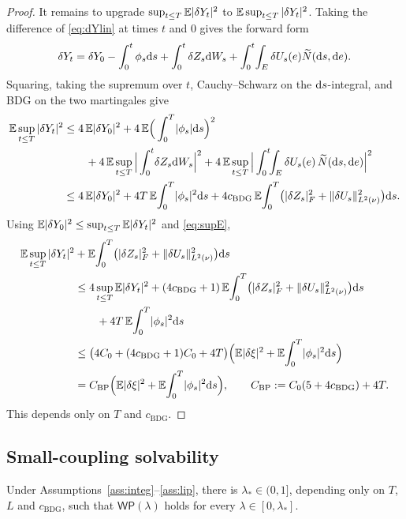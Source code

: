 \begin{proof}
It remains to upgrade $\sup_{t\le T}\mathbb{E}|\delta Y_t|^2$ to $\mathbb{E}\sup_{t\le T}|\delta Y_t|^2$. Taking the difference of
\eqref{eq:dYlin} at times $t$ and $0$ gives the forward form
\[
\delta Y_t=\delta Y_0-\int_0^t\phi_s\mathrm{d} s+\int_0^t\delta Z_s\mathrm{d} W_s+\int_0^t\!\int_E\delta U_s(e)\widetilde{N}(\mathrm{d} s,\mathrm{d} e) .
\]
Squaring, taking the supremum over $t$, Cauchy--Schwarz on the $\mathrm{d} s$-integral, and BDG on
the two martingales give
\begin{align*}
\E\sup_{t\le T}|\delta Y_t|^2
&\le 4\,\E|\delta Y_0|^2+4\,\E\Big(\int_0^T\!|\phi_s|\diff s\Big)^{2}\\
&\qquad+4\,\E\sup_{t\le T}\Big|\int_0^t\!\delta Z_s\diff W_s\Big|^{2}
+4\,\E\sup_{t\le T}\Big|\int_0^t\!\!\int_E\delta U_s(e)\,\Nt(\diff s,\diff e)\Big|^{2}\\
&\le 4\,\E|\delta Y_0|^2+4T\,\E\!\int_0^T\!|\phi_s|^2\diff s
+4c_{\mathrm{BDG}}\,\E\!\int_0^T\!\big(|\delta Z_s|_F^2+\Lnorm{\delta U_s}^2\big)\diff s .
\end{align*}
Using $\mathbb{E}|\delta Y_0|^2\le\sup_{t\le T}\mathbb{E}|\delta Y_t|^2$ and \eqref{eq:supE},
\begin{align*}
\E\sup_{t\le T}|\delta Y_t|^2
&+\E\!\int_0^T\!\big(|\delta Z_s|_F^2+\Lnorm{\delta U_s}^2\big)\diff s\\
&\le 4\sup_{t\le T}\E|\delta Y_t|^2
+(4c_{\mathrm{BDG}}+1)\,\E\!\int_0^T\!\big(|\delta Z_s|_F^2+\Lnorm{\delta U_s}^2\big)\diff s\\
&\qquad+4T\,\E\!\int_0^T\!|\phi_s|^2\diff s\\
&\le\big(4C_0+(4c_{\mathrm{BDG}}+1)C_0+4T\big)
\Big(\E|\delta\xi|^2+\E\!\int_0^T\!|\phi_s|^2\diff s\Big)\\
&=C_{\mathrm{BP}}\Big(\E|\delta\xi|^2+\E\!\int_0^T\!|\phi_s|^2\diff s\Big),
\qquad C_{\mathrm{BP}}:=C_0(5+4c_{\mathrm{BDG}})+4T .
\end{align*}
This depends only on $T$ and $c_{\mathrm{BDG}}$.
\end{proof}

\subsection{Small-coupling solvability}

\begin{lemma}\label{lem:small}
Under Assumptions~\ref{ass:integ}--\ref{ass:lip}, there is $\lambda_*\in(0,1]$, depending only on $T$, $L$ and
$c_{\mathrm{BDG}}$, such that $\mathsf{WP}(\lambda)$ holds for
every $\lambda\in[0,\lambda_*]$.
\end{lemma}

